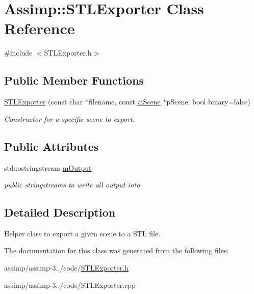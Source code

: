 \hypertarget{class_assimp_1_1_s_t_l_exporter}{\section{Assimp\+:\+:S\+T\+L\+Exporter Class Reference}
\label{class_assimp_1_1_s_t_l_exporter}
}


{\ttfamily \#include $<$S\+T\+L\+Exporter.\+h$>$}

\subsection*{Public Member Functions}
\begin{DoxyCompactItemize}
\item 
\hypertarget{class_assimp_1_1_s_t_l_exporter_a9564bb1ab6d1723b65c2d99f68953dd8}{\hyperlink{class_assimp_1_1_s_t_l_exporter_a9564bb1ab6d1723b65c2d99f68953dd8}{S\+T\+L\+Exporter} (const char $\ast$filename, const \hyperlink{structai_scene}{ai\+Scene} $\ast$p\+Scene, bool binary=false)}\label{class_assimp_1_1_s_t_l_exporter_a9564bb1ab6d1723b65c2d99f68953dd8}

\begin{DoxyCompactList}\small\item\em Constructor for a specific scene to export. \end{DoxyCompactList}\end{DoxyCompactItemize}
\subsection*{Public Attributes}
\begin{DoxyCompactItemize}
\item 
\hypertarget{class_assimp_1_1_s_t_l_exporter_a9427cb12088500844fda6f1ccaae0776}{std\+::ostringstream \hyperlink{class_assimp_1_1_s_t_l_exporter_a9427cb12088500844fda6f1ccaae0776}{m\+Output}}\label{class_assimp_1_1_s_t_l_exporter_a9427cb12088500844fda6f1ccaae0776}

\begin{DoxyCompactList}\small\item\em public stringstreams to write all output into \end{DoxyCompactList}\end{DoxyCompactItemize}


\subsection{Detailed Description}
Helper class to export a given scene to a S\+T\+L file. 

The documentation for this class was generated from the following files\+:\begin{DoxyCompactItemize}
\item 
assimp/assimp-\/3../code/\hyperlink{_s_t_l_exporter_8h}{S\+T\+L\+Exporter.\+h}\item 
assimp/assimp-\/3../code/S\+T\+L\+Exporter.\+cpp\end{DoxyCompactItemize}
